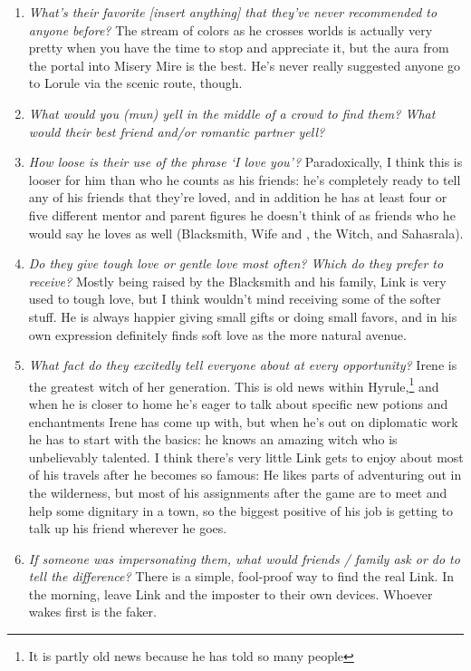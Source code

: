 \begin{enumerate}
    \item\textit{What’s their favorite [insert anything] that they’ve never recommended to anyone before?} The stream of colors as he crosses worlds is actually very pretty when you have the time to stop and appreciate it, but the aura from the portal into Misery Mire is the best. He's never really suggested anyone go to Lorule via the scenic route, though. 
    \item\textit{What would you (mun) yell in the middle of a crowd to find them? What would their best friend and/or romantic partner yell?}
    \item\textit{How loose is their use of the phrase ‘I love you’?} Paradoxically, I think this is looser for him than who he counts as his friends: he's completely ready to tell any of his friends that they're loved, and in addition he has at least four or five different mentor and parent figures he doesn't think of as friends who he would say he loves as well (Blacksmith, Wife and , the Witch, and Sahasrala). 
    \item\textit{Do they give tough love or gentle love most often? Which do they prefer to receive?} Mostly being raised by the Blacksmith and his family, Link is very used to tough love, but I think wouldn't mind receiving some of the softer stuff. He is always happier giving small gifts or doing small favors, and in his own expression definitely finds soft love as the more natural avenue. 
    \item\textit{What fact do they excitedly tell everyone about at every opportunity?} Irene is the greatest witch of her generation. This is old news within Hyrule,\footnote{It is partly old news because he has told so many people} and when he is closer to home he's eager to talk about specific new potions and enchantments Irene has come up with, but when he's out on diplomatic work he has to start with the basics: he knows an amazing witch who is unbelievably talented. I think there's very little Link gets to enjoy about most of his travels after he becomes so famous: He likes parts of adventuring out in the wilderness, but most of his assignments after the game are to meet and help some dignitary in a town, so the biggest positive of his job is getting to talk up his friend wherever he goes.
    \item\textit{If someone was impersonating them, what would friends / family ask or do to tell the difference?} There is a simple, fool-proof way to find the real Link. In the morning, leave Link and the imposter to their own devices. Whoever wakes first is the faker.

\end{enumerate}
